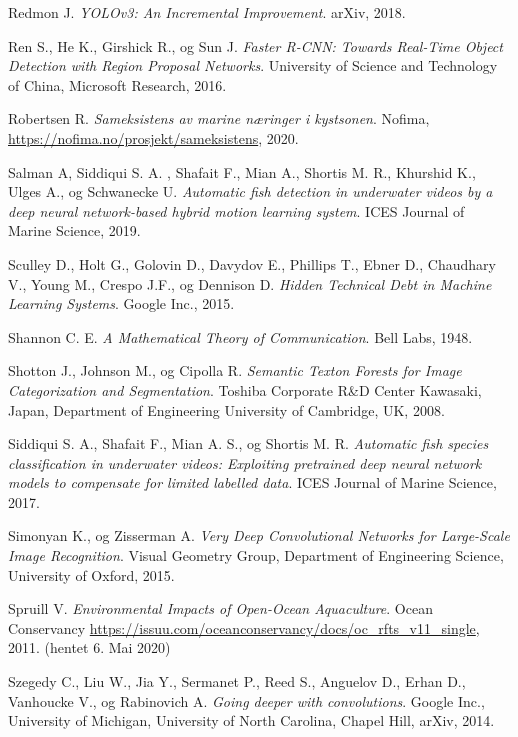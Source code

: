 \documentclass[11ot]{article}
\begin{document}
\begin{thebibliography}{9}
Redmon J. 
\textit{YOLOv3: An Incremental Improvement}. 
arXiv, 2018.

Ren S., He K., Girshick R., og Sun J.
\textit{Faster R-CNN: Towards Real-Time Object Detection with Region Proposal Networks}. 
University of Science and Technology of China, Microsoft Research, 2016.

Robertsen R. 
\textit{Sameksistens av marine næringer i kystsonen}. 
Nofima, \url{https://nofima.no/prosjekt/sameksistens}, 2020.

Salman A, Siddiqui S. A. , Shafait F., Mian A., Shortis M. R., Khurshid K., Ulges A., og Schwanecke U. 
\textit{Automatic fish detection in underwater videos by a deep neural network-based hybrid motion learning system}. 
ICES Journal of Marine Science, 2019.

Sculley D., Holt G., Golovin D., Davydov E., Phillips T., Ebner D., Chaudhary V., Young M., Crespo J.F., og Dennison D. 
\textit{Hidden Technical Debt in Machine Learning Systems}. 
Google Inc., 2015.

Shannon C. E. 
\textit{A Mathematical Theory of Communication}. 
Bell Labs, 1948.

Shotton J., Johnson M., og Cipolla R. 
\textit{Semantic Texton Forests for Image Categorization and Segmentation}. 
Toshiba Corporate R\&D Center Kawasaki, Japan, Department of Engineering University of Cambridge, UK, 2008.

Siddiqui S. A., Shafait F., Mian A. S., og Shortis M. R. 
\textit{Automatic fish species classification in underwater videos: Exploiting pretrained deep neural network models to compensate for limited labelled data}. 
ICES Journal of Marine Science, 2017.

Simonyan K., og Zisserman A. 
\textit{Very Deep Convolutional Networks for Large-Scale Image Recognition}. 
Visual Geometry Group, Department of Engineering Science, University of Oxford, 2015.

Spruill V.
\textit{Environmental Impacts of Open-Ocean Aquaculture}. 
Ocean Conservancy \url{https://issuu.com/oceanconservancy/docs/oc_rfts_v11_single}, 2011. (hentet 6. Mai 2020)

Szegedy C., Liu W., Jia Y., Sermanet P., Reed S., Anguelov D., Erhan D., Vanhoucke V., og Rabinovich A. 
\textit{Going deeper with convolutions}. 
Google Inc., University of Michigan, University of North Carolina, Chapel Hill, arXiv, 2014.


\end{thebibliography}
\end{document}
